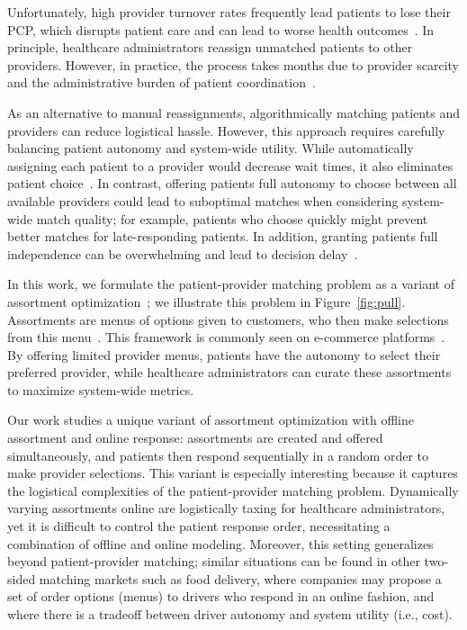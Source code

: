 \documentclass[11pt]{article}
\begin{document}
Unfortunately, high provider turnover rates frequently lead patients to lose their PCP, which disrupts patient care and can lead to worse health outcomes~\citep{pcp_turnover}. 
In principle, healthcare administrators reassign unmatched patients to other providers. However, in practice, the process takes months due to provider scarcity and the administrative burden of patient coordination~\citep{finding_new_provider}.  

As an alternative to manual reassignments, algorithmically matching patients and providers can reduce logistical hassle. However, this approach requires carefully balancing patient autonomy and system-wide utility. 
While automatically assigning each patient to a provider would decrease wait times, it also eliminates patient choice~\citep{patient_autonomy,gaynor_free_2016}. 
In contrast, offering patients full autonomy to choose between all available providers could lead to suboptimal matches when considering system-wide match quality; for example, patients who choose quickly might prevent better matches for late-responding patients. In addition, granting patients full independence can be overwhelming and lead to decision delay~\citep{bate_choice_2005}. 

In this work, we formulate the patient-provider matching problem as a variant of assortment optimization~\citep{assortment_school,assortment_dating,assortment_mnl}; we illustrate this problem in Figure~\ref{fig:pull}.
Assortments are menus of options given to customers, who then make selections from this menu~\citep{assortment_optimization}. This framework is commonly seen on e-commerce platforms~\citep{e_commerce_assortment}. 
By offering limited provider menus, patients have the autonomy to select their preferred provider, while healthcare administrators can curate these assortments to maximize system-wide metrics. 

Our work studies a unique variant of assortment optimization with offline assortment and online response: assortments are created and offered simultaneously, and patients then respond sequentially in a random order to make provider selections. 
This variant is especially interesting because it captures the logistical complexities of the patient-provider matching problem. Dynamically varying assortments online are logistically taxing for healthcare administrators, yet it is difficult to control the patient response order, necessitating a combination of offline and online modeling. 
Moreover, this setting generalizes beyond patient-provider matching; similar situations can be found in other two-sided matching markets such as food delivery, where companies may propose a set of order options (menus) to drivers who respond in an online fashion, and where there is a tradeoff between driver autonomy and system utility (i.e., cost).
\end{document}
